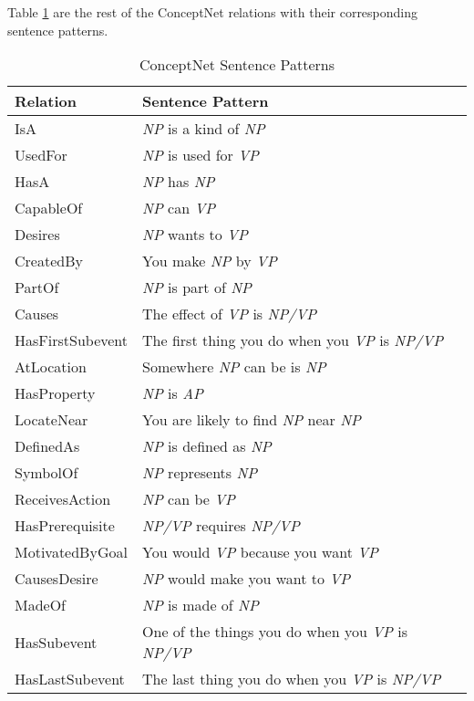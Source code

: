 Table \ref{tab:conceptnetrel} are the rest of the ConceptNet \cite{Speer:2012} relations with their corresponding sentence patterns. 

\begin{table}[ht]   %
\centering
\caption{ConceptNet Sentence Patterns} \vspace{0.25em}
\begin{tabular}{|l|l|} \hline
Relation & Sentence Pattern \\ \hline
IsA & \textit{NP} is a kind of \textit{NP} \\ \hline
UsedFor & \textit{NP} is used for \textit{VP} \\ \hline
HasA & \textit{NP} has \textit{NP} \\ \hline
CapableOf & \textit{NP} can \textit{VP} \\ \hline
Desires & \textit{NP} wants to \textit{VP} \\ \hline
CreatedBy & You make \textit{NP} by \textit{VP} \\ \hline
PartOf & \textit{NP} is part of \textit{NP} \\ \hline
Causes & The effect of \textit{VP} is \textit{NP/VP} \\ \hline
HasFirstSubevent & The first thing you do when you \textit{VP} is \textit{NP/VP} \\ \hline
AtLocation & Somewhere \textit{NP} can be is \textit{NP} \\ \hline
HasProperty & \textit{NP} is \textit{AP} \\ \hline
LocateNear & You are likely to find \textit{NP} near \textit{NP} \\ \hline
DefinedAs & \textit{NP} is defined as \textit{NP} \\ \hline
SymbolOf & \textit{NP} represents \textit{NP} \\ \hline
ReceivesAction & \textit{NP} can be \textit{VP} \\ \hline
HasPrerequisite & \textit{NP/VP} requires \textit{NP/VP} \\ \hline
MotivatedByGoal & You would \textit{VP} because you want \textit{VP} \\ \hline
CausesDesire & \textit{NP} would make you want to \textit{VP} \\ \hline
MadeOf & \textit{NP} is made of \textit{NP} \\ \hline
HasSubevent & One of the things you do when you \textit{VP} is \textit{NP/VP} \\ \hline
HasLastSubevent & The last thing you do when you \textit{VP} is \textit{NP/VP} \\ \hline
\end{tabular}
\label{tab:conceptnetrel}
\end{table}

